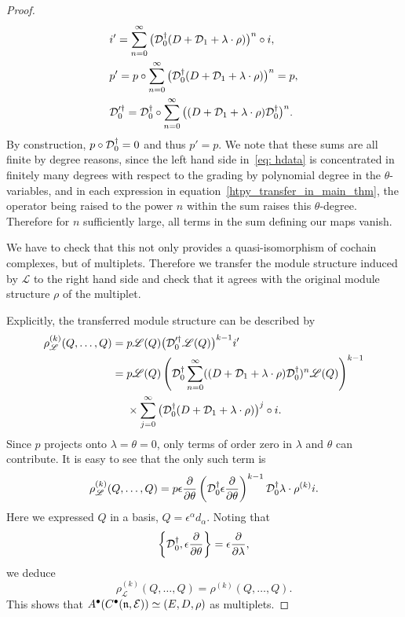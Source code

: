 \documentclass[pdftex]{sigma}
\numberwithin{equation}{section}
\def\cE{\mathcal E}\def\cF{\mathcal F}\def\cG{\mathcal G}\def\cH{\mathcal H}
\def\bu{\bullet}
\def\sL{\mathscr L}
\begin{document}
\begin{proof}
	\begin{align}
	&i' = \sum_{n=0}^{\infty} \big(\mathcal D_0^\dagger(D + \mathcal D_1 + \lambda \cdot \rho)\big)^n \circ i,\nonumber \\
	&p' = p \circ \sum_{n=0}^{\infty} \big(\mathcal D_0^\dagger(D + \mathcal D_1 + \lambda \cdot \rho)\big)^n = p,\nonumber \\
	&\mathcal D_0'^\dagger = \mathcal D_0^\dagger \circ \sum_{n = 0}^{\infty} \big((D + \mathcal D_1 + \lambda \cdot \rho) \mathcal D_0^\dagger\big)^n.	\label{htpy_transfer_in_main_thm}
	\end{align}
	By construction, $p \circ \mathcal D_0^\dagger = 0$ and thus $p' = p$. We note that these sums are all finite by degree reasons, since the left hand side in~\eqref{eq: hdata} is concentrated in finitely many degrees with respect to the grading by polynomial degree in the $\theta$-variables, and in each expression in equation~\eqref{htpy_transfer_in_main_thm}, the operator being raised to the power $n$ within the sum raises this $\theta$-degree. Therefore for $n$ sufficiently large, all terms in the sum defining our maps vanish.
	
	We have to check that this not only provides a quasi-isomorphism of cochain complexes, but of multiplets. Therefore we transfer the module structure induced by $\sL$ to the right hand side and check that it agrees with the original module structure $\rho$ of the multiplet.
	
	Explicitly, the transferred module structure can be described by
	\begin{align*}
	\rho_\sL^{(k)} (Q,\dots,Q)={}& p \sL(Q) \big(\cD_0'^\dagger \sL(Q)\big)^{k-1} i' \\
	={}&p \sL(Q) \left(\cD_0^\dagger \sum_{n = 0}^{\infty} ((D + \cD_1 + \lambda \cdot \rho) \cD_0^\dagger)^n \sL(Q)\right)^{k-1}\\
&{}\times \sum_{j=0}^{\infty} \big(\cD_0^\dagger(D + \cD_1 + \lambda \cdot \rho)\big)^j \circ i .
	\end{align*}
	Since $p$ projects onto $\lambda = \theta = 0$, only terms of order zero in $\lambda$ and $\theta$ can contribute. It is easy to see that the only such term is
	\begin{equation*}
	\rho_\sL^{(k)} (Q,\dots,Q) = p \epsilon \frac{\partial}{\partial \theta} \left(\cD_0^\dagger \epsilon \frac{\partial}{\partial \theta}\right)^{k-1} \cD_0^\dagger \lambda \cdot \rho^{(k)} i .
	\end{equation*}
	Here we expressed $Q$ in a basis, $Q = \epsilon^\alpha d_\alpha$.
	Noting that
	\begin{equation*}
	\left\{\mathcal D_0^\dagger , \epsilon \frac{\partial}{\partial \theta}\right\} = \epsilon \frac{\partial}{\partial \lambda} ,
	\end{equation*}
	we deduce
	\begin{equation*}
	\rho_\sL^{(k)} (Q,\dots,Q) = \rho^{(k)} (Q,\dots,Q) .
	\end{equation*}
	This shows that $A^\bu(C^\bu(\fn , \cE)) \simeq (E,D,\rho)$ as multiplets.
	

\end{proof}
\end{document}
